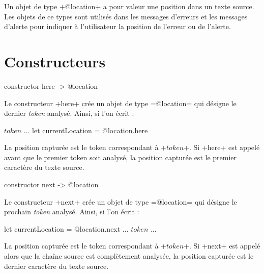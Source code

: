 



Un objet de type \ggs+@location+ a pour valeur une position dans un texte source. Les objets de ce types sont utilisés dans les messages d'erreurs et les messages d'alerte pour indiquer à l'utilisateur la position de l'erreur ou de l'alerte.











\section{Constructeurs}



\begin{galgas}
constructor here -> @location
\end{galgas}

Le constructeur \ggs+here+ crée un objet de type \ggs=@location= qui désigne le dernier \emph{token} analysé. Ainsi, si l'on écrit :

\begin{galgas}
  $token$
  ...
  let currentLocation = @location.here
\end{galgas}

La position capturée est le token correspondant à \ggs+$token$+. Si \ggs+here+ est appelé avant que le premier token soit analysé, la position capturée est le premier caractère du texte source.







\begin{galgas}
constructor next -> @location
\end{galgas}

Le constructeur \ggs+next+ crée un objet de type \ggs=@location= qui désigne le prochain \emph{token} analysé. Ainsi, si l'on écrit :

\begin{galgas}
  let currentLocation = @location.next
  ...
  $token$
  ...
\end{galgas}

La position capturée est le token correspondant à \ggs+$token$+. Si \ggs+next+ est appelé alors que la chaîne source est complètement analysée, la position capturée est le dernier caractère du texte source.







